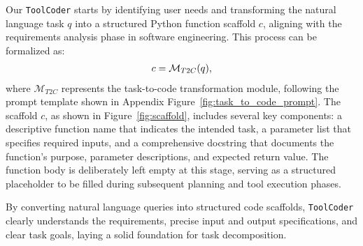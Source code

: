 Our \texttt{ToolCoder} starts by identifying user needs and transforming the natural language task $q$ into a structured Python function scaffold $c$, aligning with the requirements analysis phase in software engineering. This process can be formalized as:
\begin{equation}
\textstyle
\setlength\abovedisplayskip{0.2cm}
\setlength\belowdisplayskip{0.2cm}
\begin{aligned}
c = \mathcal{M}_{T2C}(q),
\end{aligned}
\end{equation}
where $\mathcal{M}_{T2C}$ represents the task-to-code transformation module, following the prompt template shown in Appendix Figure~\ref{fig:task_to_code_prompt}.
The scaffold $c$, as shown in Figure~\ref{fig:scaffold}, includes several key components: a descriptive function name that indicates the intended task, a parameter list that specifies required inputs, and a comprehensive docstring that documents the function's purpose, parameter descriptions, and expected return value. 
The function body is deliberately left empty at this stage, serving as a structured placeholder to be filled during subsequent planning and tool execution phases.



By converting natural language queries into structured code scaffolds, \texttt{ToolCoder} clearly understands the requirements, precise input and output specifications, and clear task goals, laying a solid foundation for task decomposition.

